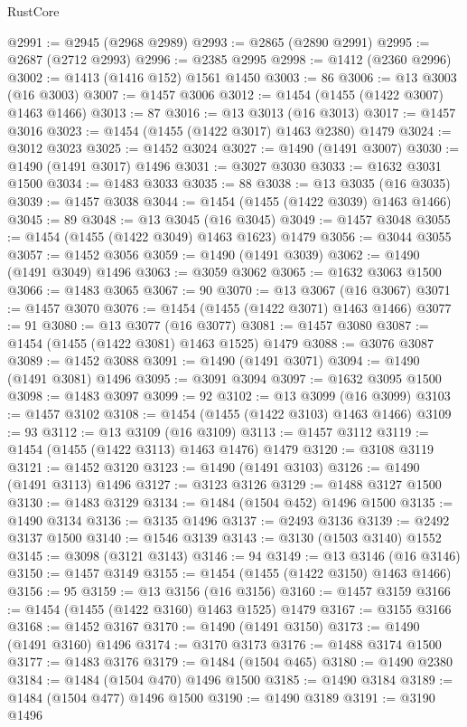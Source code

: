 \begin{lexlean}{RustCore}
\begin{coremodule}
@2991 := @2945 (@2968 @2989)
@2993 := @2865 (@2890 @2991)
@2995 := @2687 (@2712 @2993)
@2996 := @2385 @2995
@2998 := @1412 (@2360 @2996)
@3002 := @1413 (@1416 @152) @1561 @1450
@3003 := 86
@3006 := @13 @3003 (@16 @3003)
@3007 := @1457 @3006
@3012 := @1454 (@1455 (@1422 @3007) @1463 @1466)
@3013 := 87
@3016 := @13 @3013 (@16 @3013)
@3017 := @1457 @3016
@3023 := @1454 (@1455 (@1422 @3017) @1463 @2380) @1479
@3024 := @3012 @3023
@3025 := @1452 @3024
@3027 := @1490 (@1491 @3007)
@3030 := @1490 (@1491 @3017) @1496
@3031 := @3027 @3030
@3033 := @1632 @3031 @1500
@3034 := @1483 @3033
@3035 := 88
@3038 := @13 @3035 (@16 @3035)
@3039 := @1457 @3038
@3044 := @1454 (@1455 (@1422 @3039) @1463 @1466)
@3045 := 89
@3048 := @13 @3045 (@16 @3045)
@3049 := @1457 @3048
@3055 := @1454 (@1455 (@1422 @3049) @1463 @1623) @1479
@3056 := @3044 @3055
@3057 := @1452 @3056
@3059 := @1490 (@1491 @3039)
@3062 := @1490 (@1491 @3049) @1496
@3063 := @3059 @3062
@3065 := @1632 @3063 @1500
@3066 := @1483 @3065
@3067 := 90
@3070 := @13 @3067 (@16 @3067)
@3071 := @1457 @3070
@3076 := @1454 (@1455 (@1422 @3071) @1463 @1466)
@3077 := 91
@3080 := @13 @3077 (@16 @3077)
@3081 := @1457 @3080
@3087 := @1454 (@1455 (@1422 @3081) @1463 @1525) @1479
@3088 := @3076 @3087
@3089 := @1452 @3088
@3091 := @1490 (@1491 @3071)
@3094 := @1490 (@1491 @3081) @1496
@3095 := @3091 @3094
@3097 := @1632 @3095 @1500
@3098 := @1483 @3097
@3099 := 92
@3102 := @13 @3099 (@16 @3099)
@3103 := @1457 @3102
@3108 := @1454 (@1455 (@1422 @3103) @1463 @1466)
@3109 := 93
@3112 := @13 @3109 (@16 @3109)
@3113 := @1457 @3112
@3119 := @1454 (@1455 (@1422 @3113) @1463 @1476) @1479
@3120 := @3108 @3119
@3121 := @1452 @3120
@3123 := @1490 (@1491 @3103)
@3126 := @1490 (@1491 @3113) @1496
@3127 := @3123 @3126
@3129 := @1488 @3127 @1500
@3130 := @1483 @3129
@3134 := @1484 (@1504 @452) @1496 @1500
@3135 := @1490 @3134
@3136 := @3135 @1496
@3137 := @2493 @3136
@3139 := @2492 @3137 @1500
@3140 := @1546 @3139
@3143 := @3130 (@1503 @3140) @1552
@3145 := @3098 (@3121 @3143)
@3146 := 94
@3149 := @13 @3146 (@16 @3146)
@3150 := @1457 @3149
@3155 := @1454 (@1455 (@1422 @3150) @1463 @1466)
@3156 := 95
@3159 := @13 @3156 (@16 @3156)
@3160 := @1457 @3159
@3166 := @1454 (@1455 (@1422 @3160) @1463 @1525) @1479
@3167 := @3155 @3166
@3168 := @1452 @3167
@3170 := @1490 (@1491 @3150)
@3173 := @1490 (@1491 @3160) @1496
@3174 := @3170 @3173
@3176 := @1488 @3174 @1500
@3177 := @1483 @3176
@3179 := @1484 (@1504 @465)
@3180 := @1490 @2380
@3184 := @1484 (@1504 @470) @1496 @1500
@3185 := @1490 @3184
@3189 := @1484 (@1504 @477) @1496 @1500
@3190 := @1490 @3189
@3191 := @3190 @1496

\end{coremodule}
\end{lexlean}
